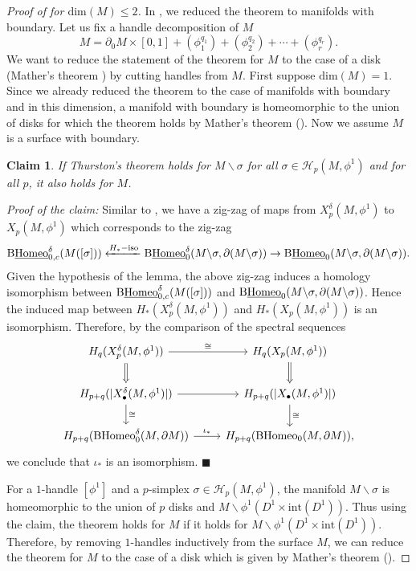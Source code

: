 \documentclass[a4paper]{amsart}
\newtheorem{claim}[thm]{Claim}
\theoremstyle{definition}
\theoremstyle{remark}
\newcommand{\BH}{\mathrm{B}\text{\textnormal{Homeo}}}
\newcommand{\BwH}{\mathrm{B}\underline{\text{\textnormal{Homeo}}}}
\newcommand{\BdH}{\mathrm{B}\text{\textnormal{Homeo}}^{\delta}}
\newcommand{\BdwH}{\mathrm{B}\underline{\text{\textnormal{Homeo}}}^{\delta}}
\numberwithin{equation}{section}
\begin{document}
\begin{proof}[Proof of  for $\text{dim}(M)\leq 2$] \label{proof} In  , we reduced the theorem to manifolds with boundary.  Let us fix a handle decomposition of $M$ 
\[
M= \partial_0 M\times [0,1]+(\phi_1^{q_1})+(\phi_2^{q_2})+\cdots+(\phi_r^{q_r}).
\]
We want to reduce the statement of the theorem for $M$ to the case of a disk (Mather's theorem \cite{MR0288777}) by cutting handles from $M$. First suppose $\text{dim}(M)=1$. Since we already reduced the theorem to the case of manifolds with boundary and in this dimension, a manifold with boundary is homeomorphic to the union of disks for which the theorem holds by Mather's theorem (\cite{MR0288777}). Now we assume $M$ is a surface with boundary.

\begin{claim}\label{reduction}
If Thurston's theorem holds for $M\backslash \sigma$ for all $\sigma\in\mathcal{H}_{p}(M,\phi^1)$ and for all $p$, it also holds for $M$.
\end{claim}
\noindent\textit{Proof of the claim:}
Similar to , we have a zig-zag of maps from $X^{\delta}_{p}(M,\phi^1)$ to $X_{p}(M,\phi^1)$ which corresponds to the zig-zag
\[
\BdwH_{0,c}(M([\sigma]))\xleftarrow{H_*-\text{iso}} \BdwH_{0}(M\backslash \sigma, \partial(M\backslash \sigma))\to \BwH_0(M\backslash \sigma, \partial(M\backslash \sigma)).
\]
Given the hypothesis of the lemma, the above zig-zag induces a homology isomorphism between $\BdwH_{0,c}(M([\sigma]))$ and $\BwH_0(M\backslash \sigma, \partial(M\backslash \sigma))$. Hence the induced map between $H_*(X^{\delta}_{p}(M,\phi^1))$ and $H_*(X_{p}(M,\phi^1))$ is an isomorphism. Therefore, by the comparison of the spectral sequences 
\[
\begin{tikzcd}
H_q(X_{p}^{\delta}(M,\phi^1))\arrow["\cong"]{r}\arrow[Rightarrow]{d}&H_q(X_{p}(M,\phi^1))\arrow[Rightarrow]{d}\\H_{p+q}(|X_{\bullet}^{\delta}(M,\phi^1)|)\arrow{r}\arrow["\cong"]{d}& H_{p+q}(|X_{\bullet}(M,\phi^1)|)\arrow["\cong"]{d}\\ H_{p+q}(\BdH_0(M,\partial M))\arrow["\iota_*"]{r}& H_{p+q}(\BH_0(M,\partial M)),
\end{tikzcd}
\]
we conclude that $\iota_*$ is an isomorphism.
$\blacksquare$

For a $1$-handle $[\phi^1]$ and a $p$-simplex $\sigma\in \mathcal{H}_{p}(M,\phi^1)$, the manifold $M\backslash \sigma$ is homeomorphic to the union of $p$ disks and $M\backslash \phi^1(D^1\times \text{int}(D^1))$. Thus using the claim, the theorem holds for $M$ if it holds for $M\backslash \phi^1(D^1\times \text{int}(D^1))$. Therefore, by removing $1$-handles inductively from the surface $M$, we can reduce the theorem for $M$ to the case of a disk which is given by Mather's theorem (\cite{MR0288777}).
\end{proof}
\end{document}
